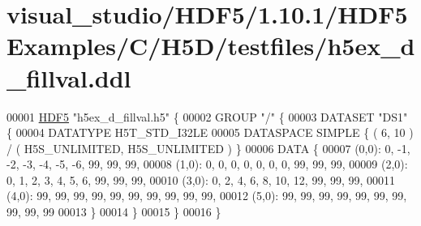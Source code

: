 \hypertarget{visual__studio_2_h_d_f5_21_810_81_2_h_d_f5_examples_2_c_2_h5_d_2testfiles_2h5ex__d__fillval_8ddl_source}{}\section{visual\+\_\+studio/\+H\+D\+F5/1.10.1/\+H\+D\+F5\+Examples/\+C/\+H5\+D/testfiles/h5ex\+\_\+d\+\_\+fillval.ddl}
\label{visual__studio_2_h_d_f5_21_810_81_2_h_d_f5_examples_2_c_2_h5_d_2testfiles_2h5ex__d__fillval_8ddl_source}

\begin{DoxyCode}
00001 \hyperlink{namespace_h_d_f5}{HDF5} \textcolor{stringliteral}{"h5ex\_d\_fillval.h5"} \{
00002 GROUP \textcolor{stringliteral}{"/"} \{
00003    DATASET \textcolor{stringliteral}{"DS1"} \{
00004       DATATYPE  H5T\_STD\_I32LE
00005       DATASPACE  SIMPLE \{ ( 6, 10 ) / ( H5S\_UNLIMITED, H5S\_UNLIMITED ) \}
00006       DATA \{
00007       (0,0): 0, -1, -2, -3, -4, -5, -6, 99, 99, 99,
00008       (1,0): 0, 0, 0, 0, 0, 0, 0, 99, 99, 99,
00009       (2,0): 0, 1, 2, 3, 4, 5, 6, 99, 99, 99,
00010       (3,0): 0, 2, 4, 6, 8, 10, 12, 99, 99, 99,
00011       (4,0): 99, 99, 99, 99, 99, 99, 99, 99, 99, 99,
00012       (5,0): 99, 99, 99, 99, 99, 99, 99, 99, 99, 99
00013       \}
00014    \}
00015 \}
00016 \}
\end{DoxyCode}
